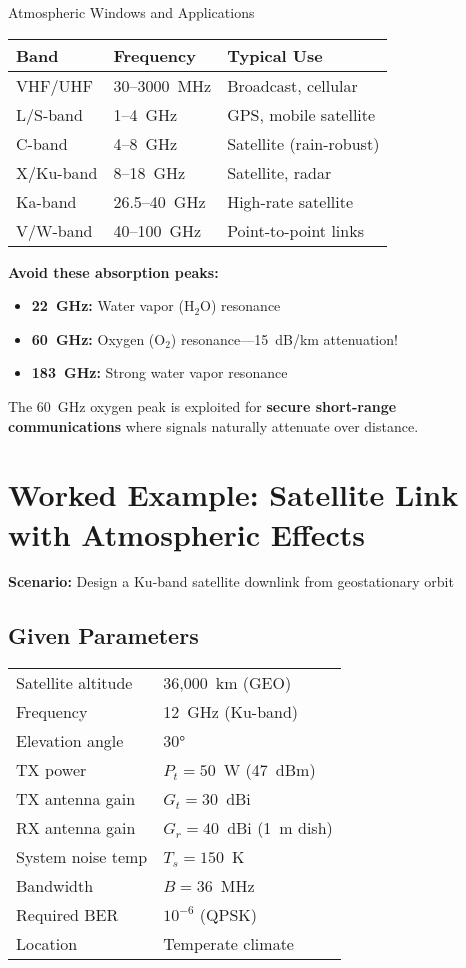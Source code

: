 \begin{calloutbox}{Atmospheric Windows and Applications}
\begin{tabular}{@{}lll@{}}
\toprule
Band & Frequency & Typical Use \\
\midrule
VHF/UHF & 30--3000~MHz & Broadcast, cellular \\
L/S-band & 1--4~GHz & GPS, mobile satellite \\
C-band & 4--8~GHz & Satellite (rain-robust) \\
X/Ku-band & 8--18~GHz & Satellite, radar \\
Ka-band & 26.5--40~GHz & High-rate satellite \\
V/W-band & 40--100~GHz & Point-to-point links \\
\bottomrule
\end{tabular}
\end{calloutbox}

\begin{warningbox}
\textbf{Avoid these absorption peaks:}
\begin{itemize}
\item \textbf{22~GHz:} Water vapor (H$_2$O) resonance
\item \textbf{60~GHz:} Oxygen (O$_2$) resonance---15~dB/km attenuation!
\item \textbf{183~GHz:} Strong water vapor resonance
\end{itemize}

The 60~GHz oxygen peak is exploited for \textbf{secure short-range communications} where signals naturally attenuate over distance.
\end{warningbox}



\section{Worked Example: Satellite Link with Atmospheric Effects}

\textbf{Scenario:} Design a Ku-band satellite downlink from geostationary orbit

\subsection*{Given Parameters}

\begin{tabular}{@{}ll@{}}
Satellite altitude & 36,000~km (GEO) \\
Frequency & 12~GHz (Ku-band) \\
Elevation angle & 30$°$ \\
TX power & $P_t = 50$~W (47~dBm) \\
TX antenna gain & $G_t = 30$~dBi \\
RX antenna gain & $G_r = 40$~dBi (1~m dish) \\
System noise temp & $T_s = 150$~K \\
Bandwidth & $B = 36$~MHz \\
Required BER & $10^{-6}$ (QPSK) \\
Location & Temperate climate \\
\end{tabular}

